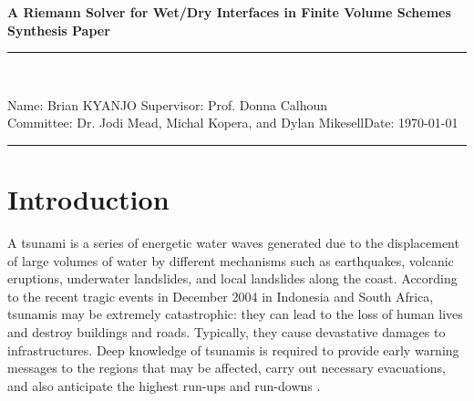 \documentclass[11pt,a4paper]{article}
\newcommand{\student}{Brian KYANJO }
\newcommand{\course}{Dr. Jodi Mead, Michal Kopera, and Dylan Mikesell}
\newcommand{\assignment}{ Prof. Donna Calhoun}
\begin{document}
	
	\thispagestyle{empty}
	\begin{center}
		\textbf{A Riemann Solver for Wet/Dry Interfaces in Finite Volume Schemes\\[0.5cm]
			Synthesis Paper}
		\vspace{.2cm}
	\end{center}
	
	
	\begin{center}
		\rule{17cm}{0.2cm}\\[0.3cm]
	\end{center}	
	
	\noindent	Name: \student \hfill Supervisor: \assignment\\[0.1cm]
	Committee: \course \hfill Date: \today\\
	\rule{17cm}{0.05cm}
	\vspace{.2cm}
	
	\section{Introduction}
	
				A tsunami is a series of energetic water waves generated due to the displacement of large volumes of water by different mechanisms such as earthquakes, volcanic eruptions, underwater landslides, and local landslides along the coast. According to the recent tragic events in December 2004 in Indonesia and  South Africa, tsunamis may be extremely catastrophic: they can lead to the loss of human lives and destroy buildings and roads. Typically, they cause devastative damages to infrastructures. Deep knowledge of tsunamis is required to provide early warning messages to the regions that may be affected, carry out necessary evacuations, and also anticipate the highest run-ups and run-downs \cite{sanchez2016uncertainty,dutykh2007water,dias2007dynamics}.
				
\end{document}
